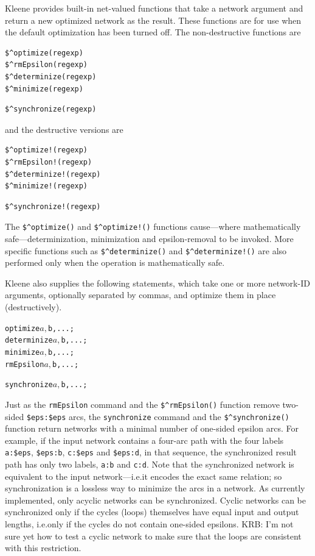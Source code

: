 \documentclass[letterpaper,12pt]{article}
\begin{document}
Kleene provides built-in net-valued functions that take a network
argument and return a new optimized network as the result.  These
functions are for use when the default optimization has been turned off.
The non-destructive functions are

\begin{Verbatim}[fontsize=\small]
$^optimize(regexp)
$^rmEpsilon(regexp)
$^determinize(regexp)
$^minimize(regexp)
\end{Verbatim}

\begin{Verbatim}[fontsize=\small]
$^synchronize(regexp)
\end{Verbatim}

\noindent
and the destructive versions are

\begin{Verbatim}[fontsize=\small]
$^optimize!(regexp)
$^rmEpsilon!(regexp)
$^determinize!(regexp)
$^minimize!(regexp)
\end{Verbatim}

\begin{Verbatim}[fontsize=\small]
$^synchronize!(regexp)
\end{Verbatim}

\noindent
The \verb!$^optimize()! and \verb/$^optimize!()/ functions cause---where
mathematically safe---determinization, minimization and epsilon-removal to
be invoked.  More specific functions such as \verb!$^determinize()! and
\verb/$^determinize!()/ are also performed only when the operation is
mathematically safe.

Kleene also supplies the following statements, which take one or more
network-ID arguments, optionally separated by commas, and optimize them
in place (destructively).

\begin{alltt}
optimize $a, $b, ... ;
determinize $a, $b, ... ;
minimize $a, $b, ... ;
rmEpsilon $a, $b, ... ;
\end{alltt}

\begin{alltt}
synchronize $a, $b, ... ;
\end{alltt}

Just as the \texttt{rmEpsilon} command and the \verb!$^rmEpsilon()!
function remove two-sided \verb!$eps:$eps! arcs, the \texttt{synchronize}
command and the \verb!$^synchronize()! function return networks with a
minimal number of one-sided epsilon arcs.  For example, if the input
network contains a four-arc path with the four labels \verb!a:$eps!,
\verb!$eps:b!, \verb!c:$eps! and \verb!$eps:d!, in that sequence, the
synchronized result path has only two labels, \verb!a:b! and \verb!c:d!.
Note that the synchronized network is equivalent to the input
network---i.e.\@ it encodes the exact same relation; so synchronization
is a lossless way to minimize the arcs in a network.  As currently
implemented, only acyclic networks can be synchronized. Cyclic
networks can be synchronized only if the cycles (loops) themselves have
equal input and output lengths, i.e.\@ only if the cycles do not contain
one-sided epsilons.  KRB:  I'm not sure yet how to test a cyclic network to
make sure that the loops are consistent with this restriction.
\end{document}
